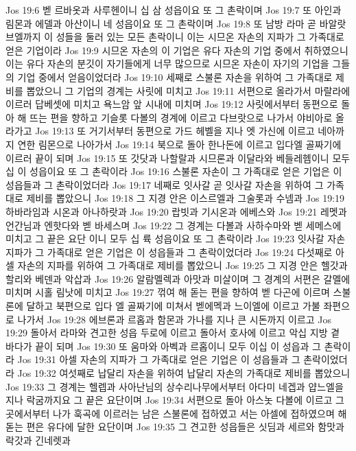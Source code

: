 Jos 19:6  벧 르바옷과 사루헨이니 십 삼 성읍이요 또 그 촌락이며
Jos 19:7  또 아인과 림몬과 에델과 아산이니 네 성읍이요 또 그 촌락이며
Jos 19:8  또 남방 라마 곧 바알랏 브엘까지 이 성들을 둘러 있는 모든 촌락이니 이는 시므온 자손의 지파가 그 가족대로 얻은 기업이라
Jos 19:9  시므온 자손의 이 기업은 유다 자손의 기업 중에서 취하였으니 이는 유다 자손의 분깃이 자기들에게 너무 많으므로 시므온 자손이 자기의 기업을 그들의 기업 중에서 얻음이었더라
Jos 19:10  세째로 스불론 자손을 위하여 그 가족대로 제비를 뽑았으니 그 기업의 경계는 사릿에 미치고
Jos 19:11  서편으로 올라가서 마랄라에 이르러 답베셋에 미치고 욕느암 앞 시내에 미치며
Jos 19:12  사릿에서부터 동편으로 돌아 해 뜨는 편을 향하고 기슬롯 다볼의 경계에 이르고 다브랏으로 나가서 야비아로 올라가고
Jos 19:13  또 거기서부터 동편으로 가드 헤벨을 지나 엣 가신에 이르고 네아까지 연한 림몬으로 나아가서
Jos 19:14  북으로 돌아 한나돈에 이르고 입다엘 골짜기에 이르러 끝이 되며
Jos 19:15  또 갓닷과 나할랄과 시므론과 이달라와 베들레헴이니 모두 십 이 성읍이요 또 그 촌락이라
Jos 19:16  스불론 자손이 그 가족대로 얻은 기업은 이 성읍들과 그 촌락이었더라
Jos 19:17  네째로 잇사갈 곧 잇사갈 자손을 위하여 그 가족대로 제비를 뽑았으니
Jos 19:18  그 지경 안은 이스르엘과 그술롯과 수넴과
Jos 19:19  하바라임과 시온과 아나하랏과
Jos 19:20  랍빗과 기시온과 에베스와
Jos 19:21  레멧과 언간님과 엔핫다와 벧 바세스며
Jos 19:22  그 경계는 다볼과 사하수마와 벧 세메스에 미치고 그 끝은 요단 이니 모두 십 륙 성읍이요 또 그 촌락이라
Jos 19:23  잇사갈 자손 지파가 그 가족대로 얻은 기업은 이 성읍들과 그 촌락이었더라
Jos 19:24  다섯째로 아셀 자손의 지파를 위하여 그 가족대로 제비를 뽑았으니
Jos 19:25  그 지경 안은 헬갓과 할리와 베덴과 악삽과
Jos 19:26  알람멜렉과 아맛과 미살이며 그 경계의 서편은 갈멜에 미치며 시홀 림낫에 미치고
Jos 19:27  꺾여 해 돋는 편을 향하여 벧 다곤에 이르며 스불론에 달하고 북편으로 입다 엘 골짜기에 미쳐서 벧에멕과 느이엘에 이르고 가불 좌편으로 나가서
Jos 19:28  에브론과 르홉과 함몬과 가나를 지나 큰 시돈까지 이르고
Jos 19:29  돌아서 라마와 견고한 성읍 두로에 이르고 돌아서 호사에 이르고 악십 지방 곁 바다가 끝이 되며
Jos 19:30  또 움마와 아벡과 르홉이니 모두 이십 이 성읍과 그 촌락이라
Jos 19:31  아셀 자손의 지파가 그 가족대로 얻은 기업은 이 성읍들과 그 촌락이었더라
Jos 19:32  여섯째로 납달리 자손을 위하여 납달리 자손의 가족대로 제비를 뽑았으니
Jos 19:33  그 경계는 헬렙과 사아난님의 상수리나무에서부터 아다미 네겝과 얍느엘을 지나 락굼까지요 그 끝은 요단이며
Jos 19:34  서편으로 돌아 아스놋 다볼에 이르고 그 곳에서부터 나가 훅곡에 이르러는 남은 스불론에 접하였고 서는 아셀에 접하였으며 해 돋는 편은 유다에 달한 요단이며
Jos 19:35  그 견고한 성읍들은 싯딤과 세르와 함맛과 락갓과 긴네렛과
